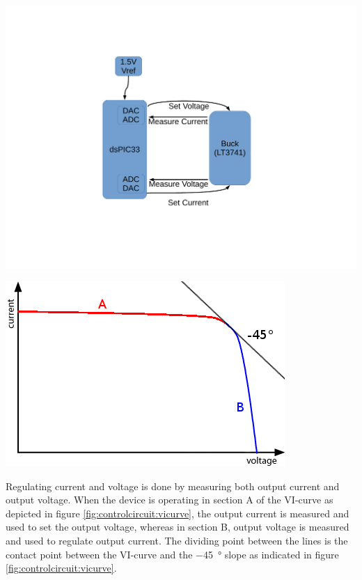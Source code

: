 \begin{minipage}{0.5\textwidth}
    \center
    \includegraphics[width=\textwidth,trim=140 140 120 100,clip]{images/block-diag-control.pdf}
    \label{fig:controlcircuit:schcematic}
\end{minipage}
\begin{minipage}{0.5\textwidth}
    \center
    \includegraphics[width=\textwidth]{images/vi-curve.png}
    \label{fig:controlcircuit:vicurve}
\end{minipage}

Regulating  current and  voltage  is  done by  measuring  both output  current
and  output  voltage. When  the  device  is operating  in  section  A  of  the
VI-curve as  depicted in  figure \ref{fig:controlcircuit:vicurve},  the output
current  is  measured  and  used  to   set  the  output  voltage,  whereas  in
section  B,   output  voltage  is   measured  and  used  to   regulate  output
current. The dividing  point between  the lines is  the contact  point between
the  VI-curve  and   the  \SI{-45}{\degree}  slope  as   indicated  in  figure
\ref{fig:controlcircuit:vicurve}.

